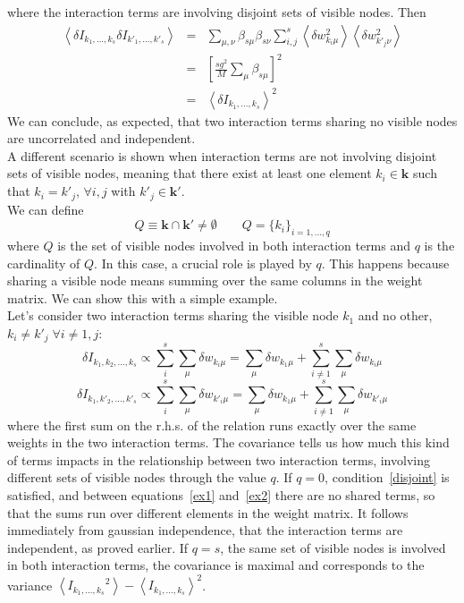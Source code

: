 \documentclass[11pt,letterpaper]{article}
\begin{document}
where the interaction terms are involving disjoint sets of visible nodes. Then
\begin{eqnarray*}
    \left\langle \delta I_{k_{1},...,k_{s}} \delta I_{k'_{1},...,k'_{s}} \right\rangle
    & = & \sum_{\mu,\nu}\beta_{s\mu}\beta_{s\nu}\sum_{i,j}^{s} \left\langle \delta w_{k_{i}\mu}^{2}\right\rangle \left\langle \delta w_{k'_{j}\nu}^{2}\right\rangle\\
    & = & \left[\frac{sg^{2}}{M} \sum_{\mu}\beta_{s\mu}\right]^{2}\\
    & = & \left\langle \delta I_{k_{1},...,k_{s}}\right\rangle^{2}
\end{eqnarray*}
We can conclude, as expected, that two interaction terms sharing no visible nodes are uncorrelated and independent.\\
A different scenario is shown when interaction terms are not involving disjoint sets of visible nodes, meaning that there exist at least one element $k_{i} \in \bm{k}$ such that $k_{i}=k'_{j}$, $\forall i,j$ with $k'_{j}\in \bm{k}'$.\\
We can define
\begin{equation*}
    Q \equiv \bm{k} \cap \bm{k}' \neq \emptyset \qquad Q=\{k_{i}\}_{i=1,...,q}
\end{equation*}
where $Q$ is the set of visible nodes involved in both interaction terms and $q$ is the cardinality of $Q$. 
In this case, a crucial role is played by $q$. This happens because sharing a visible node means summing over the same columns in the weight matrix. We can show this with a simple example.\\
Let's consider two interaction terms sharing the visible node $k_{1}$ and no other, $k_{i}\neq k'_{j}\; \forall i\neq1,j$:
\begin{equation}
    \delta I_{k_{1},k_{2},...,k_{s}} \propto \sum_{i}^{s}\sum_{\mu}\delta w_{k_{i}\mu} = \sum_{\mu} \delta w_{k_{1}\mu} + \sum_{i\neq 1}^{s}\sum_{\mu} \delta w_{k_{i}\mu} 
    \label{ex1}
\end{equation}
\begin{equation}
    \delta I_{k_{1},k'_{2},...,k'_{s}} \propto \sum_{i}^{s}\sum_{\mu}\delta w_{k'_{i}\mu} = \sum_{\mu} \delta w_{k_{1}\mu} + \sum_{i\neq 1}^{s}\sum_{\mu} \delta w_{k'_{i}\mu}
    \label{ex2}
\end{equation}
where the first sum on the r.h.s. of the relation runs exactly over the same weights in the two interaction terms. The covariance tells us how much this kind of terms impacts in the relationship between two interaction terms, involving different sets of visible nodes through the value $q$. If $q=0$, condition~\eqref{disjoint} is satisfied, and between equations~\eqref{ex1} and~\eqref{ex2} there are no shared terms, so that the sums run over different elements in the weight matrix. It follows immediately from gaussian independence, that the interaction terms are independent, as proved earlier. If $q=s$, the same set of visible nodes is involved in both interaction terms, the covariance is maximal and corresponds to the variance $\left\langle {I_{k_{1},...,k_{s}}}^{2}\right\rangle-\left\langle I_{k_{1},...,k_{s}}\right\rangle^{2}$.\\
\end{document}
